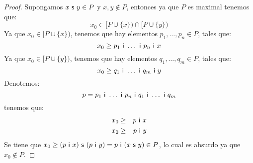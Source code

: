 \begin{proof}
    \vspace{2mm}
    \PN Supongamos $x \ \mathsf{s} \ y \in P$ y $x, y \notin P$, entonces ya que $P$ es maximal tenemos que:
    \[
      x_{0} \in \lbrack P \cup \{x\}) \cap \lbrack P \cup \{y\})
    \]
    \PN Ya que $x_{0} \in \lbrack P \cup \{x\})$, tenemos que hay elementos $p_{1}, \dotsc, p_{n} \in P$, tales que:
    \[
      x_{0} \geq p_{1} \ \mathsf{i} \ \dotsc \ \mathsf{i} \ p_{n} \ \mathsf{i} \ x
    \]
    \PN Ya que $x_{0} \in \lbrack P \cup \{y\})$, tenemos que hay elementos $q_{1}, \dotsc, q_{m} \in P$, tales que:
    \[
      x_{0} \geq q_{1} \ \mathsf{i} \ \dotsc \ \mathsf{i} \ q_{m} \ \mathsf{i} \ y
    \]
    \PN Denotemos:
    \[
      p = p_{1} \ \IN \ \dotsc \ \IN \ p_{n} \ \IN \ q_{1} \ \IN \  \dotsc \ \IN \ q_{m}
    \]
    \PN tenemos que:
    \begin{eqnarray*}
      x_{0} &\geq& p \ \mathsf{i} \ x \\
      x_{0} &\geq& p \ \mathsf{i} \ y
    \end{eqnarray*}
    \PN Se tiene que $x_{0} \geq (p \ \mathsf{i} \ x) \ \mathsf{s} \ (p \ \mathsf{i} \ y) = p \ \mathsf{i} \ (x \ \mathsf{s} \ y) \in P$, lo cual es
    absurdo ya que $x_{0} \notin P$.
  \end{proof}

